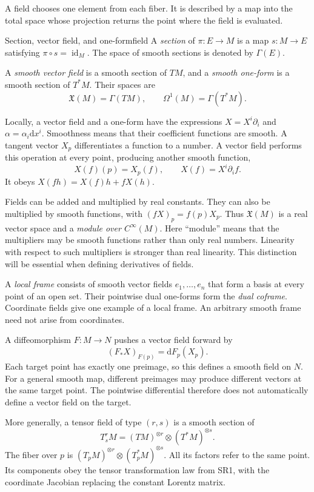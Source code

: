 \documentclass[11pt,a4paper]{article}
\numberwithin{equation}{section}
\newcommand{\dd}{\mathrm d}
\newcommand{\Cinf}{C^\infty}
\newcommand{\X}{\mathfrak X}
\newcommand{\id}{\operatorname{id}}
\begin{document}
A field chooses one element from each fiber. It is described by a map
into the total space whose projection returns the point where the field
is evaluated.

\begin{definition}{Section, vector field, and one-form}{field}
A \emph{section} of \(\pi:E\to M\) is a map \(s:M\to E\) satisfying
\(\pi\circ s=\id_M\). The space of smooth sections is denoted by
\(\Gamma(E)\).

A \emph{smooth vector field} is a smooth section of \(TM\), and a
\emph{smooth one-form} is a smooth section of \(T^*M\). Their spaces are
\[
 \X(M)=\Gamma(TM),\qquad \Omega^1(M)=\Gamma(T^*M).
\]
\end{definition}

Locally, a vector field and a one-form have the expressions
\(X=X^i\partial_i\) and \(\alpha=\alpha_i\dd x^i\). Smoothness means
that their coefficient functions are smooth. A tangent vector \(X_p\)
differentiates a function to a number. A vector field performs this
operation at every point, producing another smooth function,
\[
 X(f)(p)=X_p(f),\qquad X(f)=X^i\partial_i f.
\]
It obeys \(X(fh)=X(f)h+fX(h)\).

Fields can be added and multiplied by real constants. They can also be
multiplied by smooth functions, with \((fX)_p=f(p)X_p\). Thus \(\X(M)\)
is a real vector space and a \emph{module over \(\Cinf(M)\)}. Here
``module'' means that the multipliers may be smooth functions rather
than only real numbers. Linearity with respect to such multipliers is
stronger than real linearity. This distinction will be essential when
defining derivatives of fields.

A \emph{local frame} consists of smooth vector fields
\(e_1,\ldots,e_n\) that form a basis at every point of an open set.
Their pointwise dual one-forms form the \emph{dual coframe}.
Coordinate fields give one example of a local frame. An arbitrary smooth
frame need not arise from coordinates.

A diffeomorphism \(F:M\to N\) pushes a vector field forward by
\[
 (F_*X)_{F(p)}=\dd F_p(X_p).
\]
Each target point has exactly one preimage, so this defines a smooth
field on \(N\). For a general smooth map, different preimages may
produce different vectors at the same target point. The pointwise
differential therefore does not automatically define a vector field
on the target.

More generally, a tensor field of type \((r,s)\) is a smooth section of
\[
 T^r_sM=(TM)^{\otimes r}\otimes(T^*M)^{\otimes s}.
\]
The fiber over \(p\) is
\((T_pM)^{\otimes r}\otimes(T_p^*M)^{\otimes s}\). All its factors
refer to the same point. Its components obey the tensor transformation
law from SR1, with the coordinate Jacobian replacing the constant
Lorentz matrix.
\end{document}
